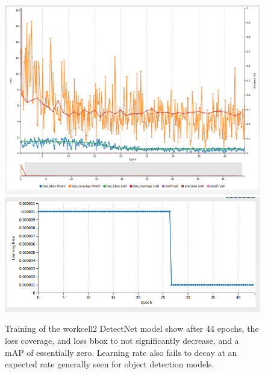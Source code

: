 \documentclass[10pt,journal,compsoc]{IEEEtran}
\begin{document}
\begin{figure}[thpb]
  \centering
  \includegraphics[width=\linewidth]{../img/Workcell2-Object-Detection/model/Workcell2-detectNet-Accuracy_loss.png} \\
  \includegraphics[width=\linewidth]{../img/Workcell2-Object-Detection/model/Workcell2-detectNet-LearningRate.png}
  \caption{Training of the workcell2 DetectNet model show after 44 epochs, the loss coverage, and loss bbox to not significantly decrease, and a mAP of essentially zero. Learning rate also fails to decay at an expected rate generally seen for object detection models.}
  \label{WC2-acc-loss}
\end{figure}
\end{document}
